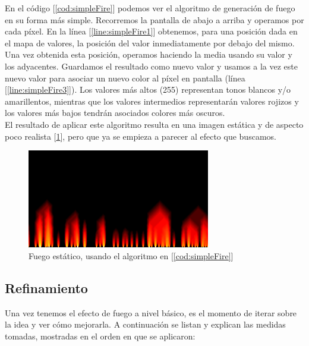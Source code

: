 En el código [\ref{cod:simpleFire}] podemos  ver el algoritmo de generación de fuego en su forma más simple. Recorremos la pantalla de abajo a arriba y operamos por cada píxel. En la línea [\ref{line:simpleFire1}] obtenemos, para una posición dada en el mapa de valores, la posición del valor inmediatamente por debajo del mismo. Una vez obtenida esta posición, operamos haciendo la media usando su valor y los adyacentes. Guardamos el resultado como nuevo valor y usamos a la vez este nuevo valor para asociar un nuevo color al píxel en pantalla (línea [\ref{line:simpleFire3}]). Los valores más altos (255) representan tonos blancos y/o amarillentos, mientras que los valores intermedios representarán valores rojizos y los valores más bajos tendrán asociados colores más oscuros.\\

El resultado de aplicar este algoritmo resulta en una imagen estática y de aspecto poco realista [\ref{fig:fire_simple}], pero que ya se empieza a parecer al efecto que buscamos.\\

\begin{figure}[h]
	\centering
	\includegraphics[width=8cm]{archivos/fire_simple}
	\caption{Fuego estático, usando el algoritmo en [\ref{cod:simpleFire}]}
	\label{fig:fire_simple}
\end{figure}

\subsection{Refinamiento}

Una vez tenemos el efecto de fuego a nivel básico, es el momento de iterar sobre la idea y ver cómo mejorarla. A continuación se listan y explican las medidas tomadas, mostradas en el orden en que se aplicaron:


